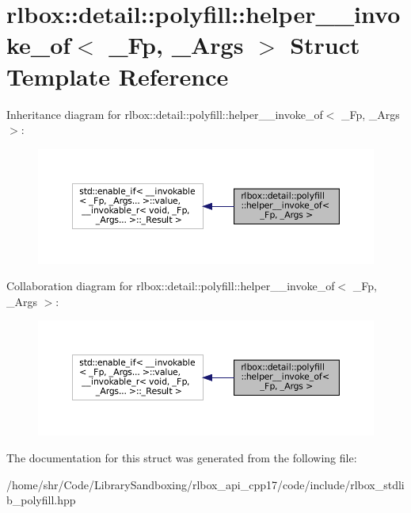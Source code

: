 \hypertarget{structrlbox_1_1detail_1_1polyfill_1_1helper____invoke__of}{}\section{rlbox\+:\+:detail\+:\+:polyfill\+:\+:helper\+\_\+\+\_\+invoke\+\_\+of$<$ \+\_\+\+Fp, \+\_\+\+Args $>$ Struct Template Reference}
\label{structrlbox_1_1detail_1_1polyfill_1_1helper____invoke__of}


Inheritance diagram for rlbox\+:\+:detail\+:\+:polyfill\+:\+:helper\+\_\+\+\_\+invoke\+\_\+of$<$ \+\_\+\+Fp, \+\_\+\+Args $>$\+:\nopagebreak
\begin{figure}[H]
\begin{center}
\leavevmode
\includegraphics[width=350pt]{structrlbox_1_1detail_1_1polyfill_1_1helper____invoke__of__inherit__graph}
\end{center}
\end{figure}


Collaboration diagram for rlbox\+:\+:detail\+:\+:polyfill\+:\+:helper\+\_\+\+\_\+invoke\+\_\+of$<$ \+\_\+\+Fp, \+\_\+\+Args $>$\+:\nopagebreak
\begin{figure}[H]
\begin{center}
\leavevmode
\includegraphics[width=350pt]{structrlbox_1_1detail_1_1polyfill_1_1helper____invoke__of__coll__graph}
\end{center}
\end{figure}


The documentation for this struct was generated from the following file\+:\begin{DoxyCompactItemize}
\item 
/home/shr/\+Code/\+Library\+Sandboxing/rlbox\+\_\+api\+\_\+cpp17/code/include/rlbox\+\_\+stdlib\+\_\+polyfill.\+hpp\end{DoxyCompactItemize}
